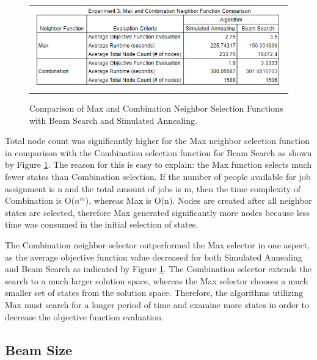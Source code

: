\documentclass[10pt, twocolumn]{article}
\begin{document}
\begin{figure}[!h]
    \centering
    \begin{tabular}[b]{c}
        \includegraphics[width=1\linewidth]{exp_three.png} \\
    \end{tabular} \qquad
    \caption{Comparison of Max and Combination Neighbor Selection Functions with Beam Search and Simulated Annealing.}  \label{exp_three}
\end{figure}

Total node count was significantly higher for the Max neighbor selection function in comparison with the Combination selection function for Beam Search as shown by Figure \ref{exp_three}. The reason for this is easy to explain: the Max function selects much fewer states than Combination selection. If the number of people available for job assignment is n and the total amount of jobs is m, then the time complexity of Combination is O($n^m$), whereas Max is O(n). Nodes are created after all neighbor states are selected, therefore Max generated significantly more nodes because less time was consumed in the initial selection of states.


The Combination neighbor selector outperformed the Max selector in one aspect, as the average objective function value decreased for both Simulated Annealing and Beam Search as indicated by Figure \ref{exp_three}. The Combination selector extends the search to a much larger solution space, whereas the Max selector chooses a much smaller set of states from the solution space. Therefore, the algorithms utilizing Max must search for a longer period of time and examine more states in order to decrease the objective function evaluation.


\subsection{Beam Size}
\end{document}

